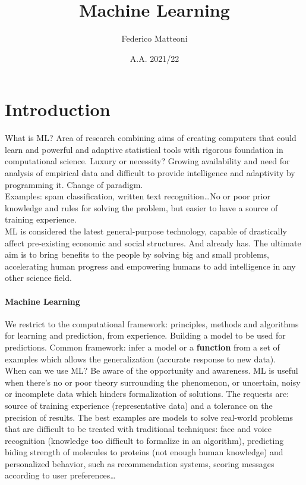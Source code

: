 \documentclass[10pt]{report}
\begin{document}
\title{Machine Learning}
\author{Federico Matteoni}
\date{A.A. 2021/22}
\renewcommand*\contentsname{Index}

\maketitle
\begin{multicols}{2}
\tableofcontents
\end{multicols}
\pagebreak
\section{Introduction}
What is ML? Area of research combining aims of creating computers that could learn and powerful and adaptive statistical tools with rigorous foundation in computational science. Luxury or necessity? Growing availability and need for analysis of empirical data and difficult to provide intelligence and adaptivity by programming it. Change of paradigm.\\
Examples: spam classification, written text recognition\ldots No or poor prior knowledge and rules for solving the problem, but easier to have a source of training experience.\\
ML is considered the latest general-purpose technology, capable of drastically affect pre-existing economic and social structures. And already has. The ultimate aim is to bring benefits to the people by solving big and small problems, accelerating human progress and empowering humans to add intelligence in any other science field.
\paragraph{Machine Learning} We restrict to the computational framework: principles, methods and algorithms for learning and prediction, from experience. Building a model to be used for predictions. Common framework: infer a model or a \textbf{function} from a set of examples which allows the generalization (accurate response to new data).\\
When can we use ML? Be aware of the opportunity and awareness. ML is useful when there's no or poor theory surrounding the phenomenon, or uncertain, noisy or incomplete data which hinders formalization of solutions. The requests are: source of training experience (representative data) and a tolerance on the precision of results. The best examples are models to solve real-world problems that are difficult to be treated with traditional techniques: face and voice recognition (knowledge too difficult to formalize in an algorithm), predicting biding strength of molecules to proteins (not enough human knowledge) and personalized behavior, such as recommendation systems, scoring messages according to user preferences\ldots
\end{document}
